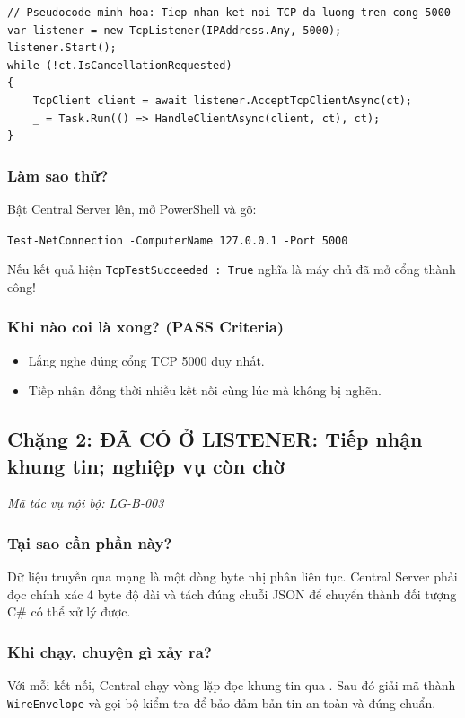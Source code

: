 \documentclass[12pt,a4paper]{article}
\begin{document}
\begin{lstlisting}[language=CSharp, caption={Pseudocode minh họa: Vòng lặp tiếp nhận kết nối TCP của Central Server}]
// Pseudocode minh hoa: Tiep nhan ket noi TCP da luong tren cong 5000
var listener = new TcpListener(IPAddress.Any, 5000);
listener.Start();
while (!ct.IsCancellationRequested)
{
    TcpClient client = await listener.AcceptTcpClientAsync(ct);
    _ = Task.Run(() => HandleClientAsync(client, ct), ct);
}
\end{lstlisting}

\subsubsection{Làm sao thử?}
Bật Central Server lên, mở PowerShell và gõ:
\begin{center}\texttt{Test-NetConnection -ComputerName 127.0.0.1 -Port 5000}\end{center}
Nếu kết quả hiện \texttt{TcpTestSucceeded : True} nghĩa là máy chủ đã mở cổng thành công!

\subsubsection{Khi nào coi là xong? (PASS Criteria)}
\begin{itemize}
  \item Lắng nghe đúng cổng TCP 5000 duy nhất.
  \item Tiếp nhận đồng thời nhiều kết nối cùng lúc mà không bị nghẽn.
\end{itemize}

\subsection{Chặng 2: ĐÃ CÓ Ở LISTENER: Tiếp nhận khung tin; nghiệp vụ còn chờ}
{\footnotesize\color{lgGray}\textit{Mã tác vụ nội bộ: LG-B-003}}\par
\vspace{2mm}

\subsubsection{Tại sao cần phần này?}
Dữ liệu truyền qua mạng là một dòng byte nhị phân liên tục. Central Server phải đọc chính xác 4 byte độ dài và tách đúng chuỗi JSON để chuyển thành đối tượng C\# có thể xử lý được.

\subsubsection{Khi chạy, chuyện gì xảy ra?}
Với mỗi kết nối, Central chạy vòng lặp đọc khung tin qua . Sau đó giải mã thành \texttt{WireEnvelope} và gọi bộ kiểm tra  để bảo đảm bản tin an toàn và đúng chuẩn.
\end{document}
